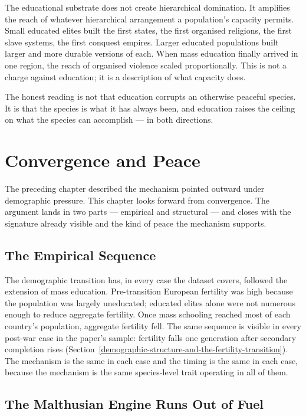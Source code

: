 \documentclass[12pt,letterpaper]{article}
\begin{document}
The educational substrate does not create hierarchical domination. It
amplifies the reach of whatever hierarchical arrangement a
population's capacity permits. Small educated elites built the first
states, the first organised religions, the first slave systems, the
first conquest empires. Larger educated populations built larger and
more durable versions of each. When mass education finally arrived in
one region, the reach of organised violence scaled proportionally.
This is not a charge against education; it is a description of what
capacity does.

The honest reading is not that education corrupts an otherwise
peaceful species. It is that the species is what it has always been,
and education raises the ceiling on what the species can accomplish
--- in both directions.

\section{Convergence and Peace}\label{convergence-and-peace}

The preceding chapter described the mechanism pointed outward under
demographic pressure. This chapter looks forward from convergence.
The argument lands in two parts --- empirical and structural --- and
closes with the signature already visible and the kind of peace the
mechanism supports.

\subsection{The Empirical Sequence}\label{the-empirical-sequence}

The demographic transition has, in every case the dataset covers,
followed the extension of mass education. Pre-transition European
fertility was high because the population was largely uneducated;
educated elites alone were not numerous enough to reduce aggregate
fertility. Once mass schooling reached most of each country's
population, aggregate fertility fell. The same sequence is visible in
every post-war case in the paper's sample: fertility falls one
generation after secondary completion rises
(Section~\ref{demographic-structure-and-the-fertility-transition}).
The mechanism is the same in each case and the timing is the same in
each case, because the mechanism is the same species-level trait
operating in all of them.

\subsection{The Malthusian Engine Runs Out of Fuel}\label{the-malthusian-engine}
\end{document}
